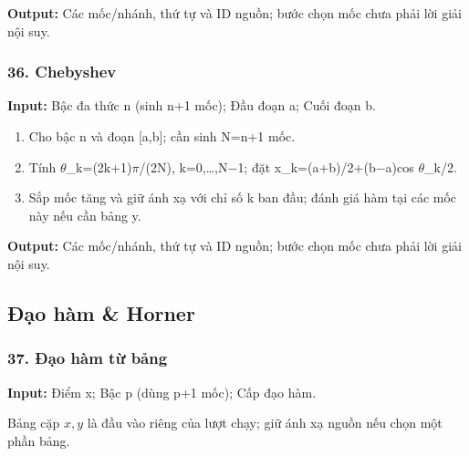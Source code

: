 \textbf{Output:} Các mốc/\allowbreak{}nhánh,\allowbreak{} thứ tự và ID nguồn;\allowbreak{} bước chọn mốc chưa phải lời giải nội suy.

\examplebreak\subsubsection*{36. Chebyshev}

\textbf{Input:} Bậc đa thức n (\allowbreak{}sinh n+\allowbreak{}1 mốc);\allowbreak{} Đầu đoạn a;\allowbreak{} Cuối đoạn b.

\begin{enumerate}

\item Cho bậc n và đoạn [a,\allowbreak{}b];\allowbreak{} cần sinh N=\allowbreak{}n+\allowbreak{}1 mốc.

\item Tính \ensuremath{\theta}\_k=\allowbreak{}(\allowbreak{}2k+\allowbreak{}1)\ensuremath{\pi}/\allowbreak{}(\allowbreak{}2N),\allowbreak{} k=\allowbreak{}0,\allowbreak{}…,\allowbreak{}N\ensuremath{-}1;\allowbreak{} đặt x\_k=\allowbreak{}(\allowbreak{}a+\allowbreak{}b)/\allowbreak{}2+\allowbreak{}(\allowbreak{}b\ensuremath{-}a)cos \ensuremath{\theta}\_k/\allowbreak{}2.

\item Sắp mốc tăng và giữ ánh xạ với chỉ số k ban đầu;\allowbreak{} đánh giá hàm tại các mốc này nếu cần bảng y.

\end{enumerate}

\textbf{Output:} Các mốc/\allowbreak{}nhánh,\allowbreak{} thứ tự và ID nguồn;\allowbreak{} bước chọn mốc chưa phải lời giải nội suy.

\subsection{Đạo hàm \& Horner}

\examplebreak\subsubsection*{37. Đạo hàm từ bảng}

\textbf{Input:} Điểm x;\allowbreak{} Bậc p (\allowbreak{}dùng p+\allowbreak{}1 mốc);\allowbreak{} Cấp đạo hàm.

Bảng cặp $x,y$ là đầu vào riêng của lượt chạy; giữ ánh xạ nguồn nếu chọn một phần bảng.

